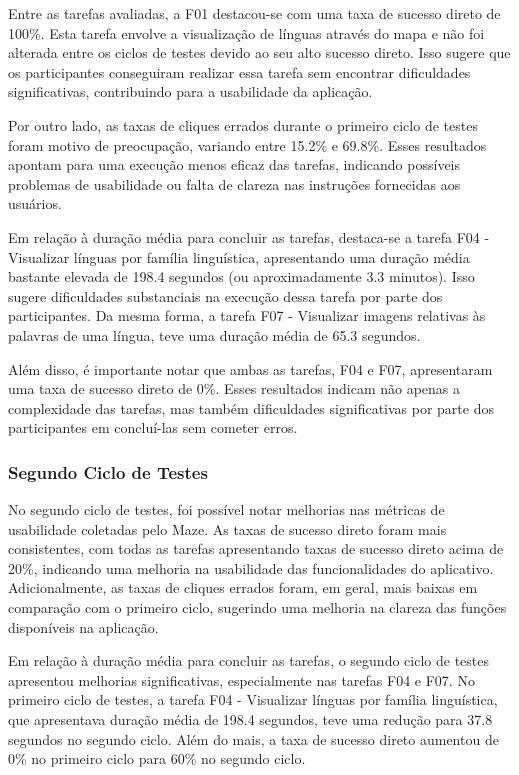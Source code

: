 Entre as tarefas avaliadas, a F01 destacou-se com uma taxa de sucesso direto de 100\%. Esta tarefa envolve a visualização de línguas através do mapa e não foi alterada entre os ciclos de testes devido ao seu alto sucesso direto. Isso sugere que os participantes conseguiram realizar essa 
tarefa sem encontrar dificuldades significativas, contribuindo para a usabilidade da aplicação.

Por outro lado, as taxas de cliques errados durante o primeiro ciclo de testes foram motivo de preocupação, variando entre 15.2\% e 69.8\%. Esses resultados apontam para uma execução menos eficaz das tarefas, indicando possíveis problemas de usabilidade ou falta de clareza nas instruções 
fornecidas aos usuários.

Em relação à duração média para concluir as tarefas, destaca-se a tarefa F04 - Visualizar línguas por família linguística, apresentando uma duração média bastante elevada de 198.4 segundos (ou aproximadamente 3.3 minutos). Isso sugere dificuldades substanciais na execução 
dessa tarefa por parte dos participantes. Da mesma forma, a tarefa F07 - Visualizar imagens relativas às palavras de uma língua, teve uma duração média de 65.3 segundos.

Além disso, é importante notar que ambas as tarefas, F04 e F07, apresentaram uma taxa de sucesso direto de 0\%. Esses resultados indicam não apenas a complexidade das tarefas, mas também dificuldades significativas por parte dos participantes em concluí-las sem cometer erros. 

\subsubsection{Segundo Ciclo de Testes}
\label{sec:Segundo Ciclo de Testes}
No segundo ciclo de testes, foi possível notar melhorias nas métricas de usabilidade coletadas pelo Maze. As taxas de sucesso direto foram mais consistentes, com todas as tarefas apresentando taxas de sucesso direto acima de 20\%, indicando uma melhoria na usabilidade das 
funcionalidades do aplicativo. Adicionalmente, as taxas de cliques errados foram, em geral, mais baixas em comparação com o primeiro ciclo, sugerindo uma melhoria na clareza das funções disponíveis na aplicação.

Em relação à duração média para concluir as tarefas, o segundo ciclo de testes apresentou melhorias significativas, especialmente nas tarefas F04 e F07. No primeiro ciclo de testes, a tarefa F04 - Visualizar línguas por família linguística, que apresentava duração média de 
198.4 segundos, teve uma redução para 37.8 segundos no segundo ciclo. Além do mais, a taxa de sucesso direto aumentou de 0\% no primeiro ciclo para 60\% no segundo ciclo.

